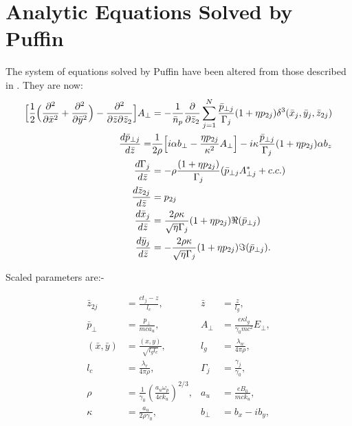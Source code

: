 \documentclass[12pt]{article}%
\begin{document}
\newpage

\section{Analytic Equations Solved by Puffin}

The system of equations solved by Puffin have been altered from those described in \cite{puffin}. They are now:
\begin{align}
\Bigl[\frac{1}{2}\Bigl(\frac{\partial^2}{\partial\bar{x}^2} + \frac{\partial^2}{\partial\bar{y}^2}\Bigr) -  \frac{\partial^2}{\partial\bar{z}\partial\bar{z}_2}\Bigr]A_{\bot}  & = -\frac{1}{\bar{n}_p}\frac{\partial}{\partial \bar{z}_2}\sum_{j=1}^{N} \frac{\bar{p}_{\bot j}}{\Gamma_j} (1+\eta p_{2j})     \delta^3(\bar{x}_j,\bar{y}_j,\bar{z}_{2j})  \label{fieldeq2} \\
\frac{d \bar{p}_{\bot j}}{d \bar{z}} = & \frac{1}{2\rho}\Bigl[ i \alpha b_{\bot} - \frac{\eta p_{2j}}{\kappa^2}A_{\bot} \Bigr] - i\kappa \frac{ \bar{p}_{\bot j}}{\Gamma_j} (1 + \eta p_{2j})  \alpha b_z \label{pperpeqn2} \\
\frac{d \Gamma_{j}}{d \bar{z}} &= - \rho \frac{(1 + \eta p_{2j})}{\Gamma_j} (\bar{p}_{\bot j} A^*_{\bot j} + c.c.)  \label{gameqn} \\
\frac{d\bar{z}_{2j}}{d\bar{z}}& = p_{2j}  \label{z2eqgen2} \\
\frac{d\bar{x}_j}{d\bar{z}} &=  \frac{2 \rho \kappa}{\sqrt{\eta} \Gamma_j} (1 + \eta p_{2j}) \Re(\bar{p}_{\bot j}) \label{xeqgen2} \\
\frac{d\bar{y}_j}{d\bar{z}} &= - \frac{2 \rho \kappa}{\sqrt{\eta} \Gamma_j}  (1 + \eta p_{2j}) \Im(\bar{p}_{\bot j}). \label{yeqgen2}
\end{align}



Scaled parameters are:-






\begin{align}
\bar{z}_{2j} &= \frac{ct_j - z}{l_c}, &\bar{z} &= \frac{z}{l_g}, \nonumber \\
\bar{p}_{\bot} &= \frac{p_{\bot}}{mc a_u},
&A_{\bot}&=\frac{e \kappa l_g}{\gamma_0 mc^2 }E_{\bot}, \nonumber \\
(\bar{x},\bar{y}) &= \frac{(x,y)}{\sqrt{l_g l_c}}, &l_g &= \frac{\lambda_w}{4\pi\rho}, \nonumber \\
l_c &= \frac{\lambda_r}{4\pi\rho}, & \Gamma_j& = \frac{\gamma_j}{\gamma_0}, \nonumber \\
\rho &=\frac{1}{\gamma_0}\left(\frac{a_u \omega_p}{4ck_u}\right)^{2/3}, 
&a_u & =\frac{eB_0}{mck_u}, \nonumber \\
\kappa & = \frac{a_u}{2 \rho \gamma_0}, & b_{\bot} & = b_x - i b_y, \nonumber
\end{align}
\end{document}

